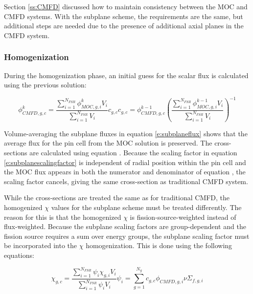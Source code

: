 Section \ref{ss:CMFD} discussed how to maintain consistency between the MOC and CMFD systems.  With the subplane scheme, the requirements are the same, but additional steps are needed due to the presence of additional axial planes in the CMFD system.

\subsubsection{Homogenization}

During the homogenization phase, an initial guess for the scalar flux is calculated using the previous solution:

\begin{subequations}
\begin{equation}\label{e:subplaneflux}
\phi_{CMFD,g,c}^k = \frac{\sum_{i=1}^{N_{FSR}} \phi_{MOC,g,i}^{k}V_i}{\sum_{i=1}^{N_{FSR}}V_i} c_{g,c}
\end{equation}
\begin{equation}\label{e:subplanescalingfactor}
c_{g,c}=\phi_{CMFD,g,c}^{k-1}\left(\frac{\sum_{i=1}^{N_{FSR}} \phi_{MOC,g,i}^{k-1}V_i}{\sum_{i=1}^{N_{FSR}}V_i}\right)^{-1}
\end{equation}
\end{subequations}

Volume-averaging the subplane fluxes in equation \ref{e:subplaneflux} shows that the average flux for the pin cell from the MOC solution is preserved.  The cross-sections are calculated using equation .  Because the scaling factor in equation \ref{e:subplanescalingfactor} is independent of radial position within the pin cell and the MOC flux appears in both the numerator and denominator of equation , the scaling factor cancels, giving the same cross-section as traditional CMFD system.

While the cross-sections are treated the same as for traditional CMFD, the homogenized $\chi$ values for the subplane scheme must be treated differently.  The reason for this is that the homogenized $\chi$ is fission-source-weighted instead of flux-weighted.  Because the subplane scaling factors are group-dependent and the fission source requires a sum over energy groups, the subplane scaling factor must be incorporated into the $\chi$ homogenization.  This is done using the following equations:

\begin{subequations}
\begin{equation}
\chi_{g,c} = \frac{\sum_{i=1}^{N_{FSR}} \psi_i \chi_{g,i} V_i}{\sum_{i=1}^{N_{FSR}} \psi_i V_i}
\end{equation}
\begin{equation}
\psi_{i} = \sum_{g=1}^{N_g} c_{g,c} \phi_{CMFD,g,i} \nu\Sigma_{f,g,i} 
\end{equation}
\end{subequations}

